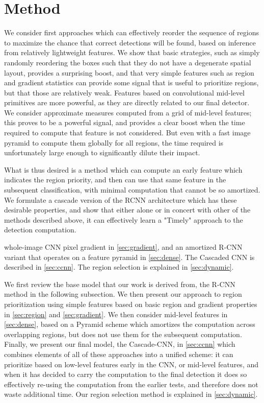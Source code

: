 \section{Method}\label{sec:method}

We consider first approaches which can effectively reorder the sequence of regions to maximize the chance that correct detections will be found, based on inference from relatively lightweight features.  We show that basic strategies, such as simply randomly reordering the boxes such that they do not have a degenerate spatial layout, provides a surprising boost, and that very simple features such as region and gradient statistics can provide some signal that is useful to prioritize regions, but that those are relatively weak.  Features based on convolutional mid-level primitives are more powerful, as they are directly related to our final detector.  We consider approximate measures computed from a grid of mid-level features; this proves to be a powerful signal, and provides a clear boost when the time required to compute that feature is not considered.    But even with a fast image pyramid to compute them globally for all regions, the time required is unfortunately large enough to significantly dilute their impact.   

What is thus desired is a method which can compute an early feature which indicates the region priority, and then can use that same feature in the subsequent classification, with minimal computation that cannot be so amortized.  We formulate a cascade version of the RCNN architecture which has these desirable properties, and show that either alone or in concert with other of the methods described above, it can effectively learn a "Timely" approach to the detection computation.

 whole-image CNN pixel gradient in \autoref{sec:gradient}, and an amortized R-CNN variant that operates on a feature pyramid in \autoref{sec:dense}.
The Cascaded CNN is described in \autoref{sec:ccnn}.
The region selection is explained in \autoref{sec:dynamic}.

We first review the base model that our work is derived from, the R-CNN method in the following subsection.  We then present our approach to region prioritization using simple features based on basic region and gradient properties in \autoref{sec:region} and \autoref{sec:gradient}.  We then consider mid-level features in \autoref{sec:dense}, based on a Pyramid scheme which amortizes the computation across overlapping regions, but does not use them for the subsequent computation.  Finally, we present our final model, the Cascade-CNN, in \autoref{sec:ccnn} which combines elements of all of these approaches into a unified scheme: it can prioritize based on low-level features early in the CNN, or mid-level features, and when it has decided to carry the computation to the final detection it does so effectively re-using the computation from the earlier tests, and therefore does not waste additional time. Our region selection method is explained in \autoref{sec:dynamic}.

